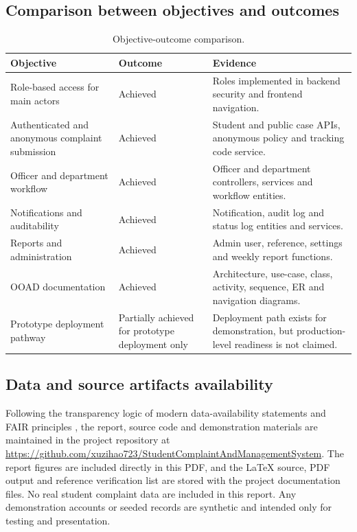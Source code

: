 \documentclass[11pt,a4paper]{article}
\begin{document}
\subsection{Comparison between objectives and outcomes}
\begin{table}[H]
\centering
\small
\begin{tabularx}{\textwidth}{p{}p{}Y}
\toprule
Objective & Outcome & Evidence\\
\midrule
Role-based access for main actors & Achieved & Roles implemented in backend security and frontend navigation.\\
Authenticated and anonymous complaint submission & Achieved & Student and public case APIs, anonymous policy and tracking code service.\\
Officer and department workflow & Achieved & Officer and department controllers, services and workflow entities.\\
Notifications and auditability & Achieved & Notification, audit log and status log entities and services.\\
Reports and administration & Achieved & Admin user, reference, settings and weekly report functions.\\
OOAD documentation & Achieved & Architecture, use-case, class, activity, sequence, ER and navigation diagrams.\\
Prototype deployment pathway & Partially achieved for prototype deployment only & Deployment path exists for demonstration, but production-level readiness is not claimed.\\
\bottomrule
\end{tabularx}
\caption{Objective-outcome comparison.}
\end{table}

\subsection{Data and source artifacts availability}
Following the transparency logic of modern data-availability statements and FAIR principles \cite{Wilkinson2016FAIR,SpringerNatureDataPolicy}, the report, source code and demonstration materials are maintained in the project repository at \url{https://github.com/xuzihao723/StudentComplaintAndManagementSystem}. The report figures are included directly in this PDF, and the LaTeX source, PDF output and reference verification list are stored with the project documentation files. No real student complaint data are included in this report. Any demonstration accounts or seeded records are synthetic and intended only for testing and presentation.
\end{document}
